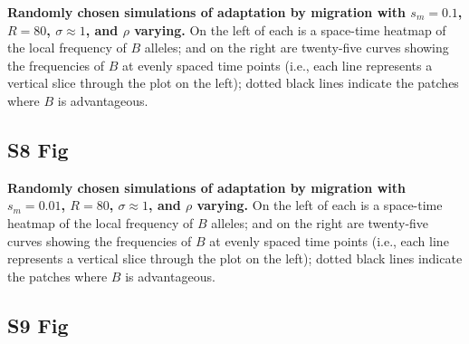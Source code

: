 \documentclass[10pt,letterpaper]{article}
\begin{document}
\textbf{Randomly chosen simulations of adaptation by migration
with $s_m=0.1$, $R=80$, $\sigma\approx 1$, and $\rho$ varying.}
    On the left of each is a space-time heatmap of the local frequency of $B$ alleles;
    and on the right are twenty-five curves showing the frequencies of $B$ at evenly spaced time points
    (i.e., each line represents a vertical slice through the plot on the left);
    dotted black lines indicate the patches where $B$ is advantageous.


\subsection*{S8 Fig}
\label{sfig:sims_6}

\textbf{Randomly chosen simulations of adaptation by migration
with $s_m=0.01$, $R=80$, $\sigma\approx 1$, and $\rho$ varying.}
    On the left of each is a space-time heatmap of the local frequency of $B$ alleles;
    and on the right are twenty-five curves showing the frequencies of $B$ at evenly spaced time points
    (i.e., each line represents a vertical slice through the plot on the left);
    dotted black lines indicate the patches where $B$ is advantageous.

\subsection*{S9 Fig}
\label{sfig:sims_7}
\end{document}
